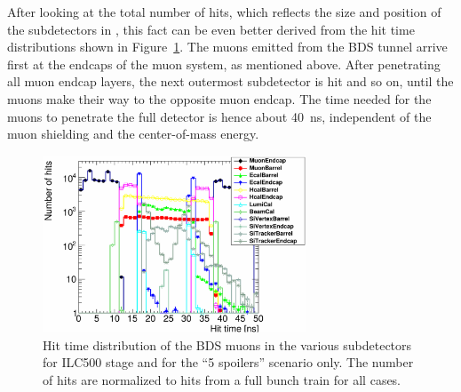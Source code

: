 After looking at the total number of hits, which reflects the size and position of the subdetectors in \sid, this fact can be even better derived from the hit time distributions shown in Figure~\ref{fig:BDS_Muons:hittime}.
The muons emitted from the BDS tunnel arrive first at the endcaps of the muon system, as mentioned above.
After penetrating all muon endcap layers, the next outermost subdetector is hit and so on, until the muons make their way to the opposite muon endcap.
The time needed for the muons to penetrate the full detector is hence about \SI{40}{\nano\second}, independent of the muon shielding and the center-of-mass energy.
\begin{figure}[htbp!]
\centering
\includegraphics[width=0.7\textwidth]{Figures/BDS_muons/hittime_ILC500_spoilers_superimposed.pdf}
\caption[Muon hit time in the \sid subdetectors]{Hit time distribution of the BDS muons in the various \sid subdetectors for ILC500 stage and for the ``5 spoilers'' scenario only.
The number of hits are normalized to hits from a full bunch train for all cases.}
\label{fig:BDS_Muons:hittime}
\end{figure}


